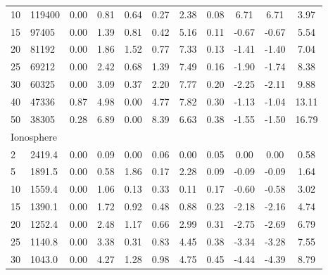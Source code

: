 {\begin{longtable}{@{}llccccccccc@{}}
10 & 119400     & 0.00         & 0.81         & 0.64        & 0.27       & 2.38        & 0.08      & 6.71      & 6.71      & 3.97  \\
15 & 97405      & 0.00         & 1.39         & 0.81        & 0.42       & 5.16        & 0.11      & -0.67     & -0.67     & 5.54  \\
20 & 81192      & 0.00         & 1.86         & 1.52        & 0.77       & 7.33        & 0.13      & -1.41     & -1.40     & 7.04  \\
25 & 69212      & 0.00         & 2.42         & 0.68        & 1.39       & 7.49        & 0.16      & -1.90     & -1.74     & 8.38  \\
30 & 60325      & 0.00         & 3.09         & 0.37        & 2.20       & 7.77        & 0.20      & -2.25     & -2.11     & 9.88  \\
40 & 47336      & 0.87         & 4.98         & 0.00        & 4.77       & 7.82        & 0.30      & -1.13     & -1.04     & 13.11 \\
50 & 38305      & 0.28         & 6.89         & 0.00        & 8.39       & 6.63        & 0.38      & -1.55     & -1.50     & 16.79 \\
\multicolumn{11}{l}{Ionosphere}                                                                                                    \\
2  & 2419.4     & 0.00         & 0.09         & 0.00        & 0.06       & 0.00        & 0.05      & 0.00      & 0.00      & 0.58  \\
5  & 1891.5     & 0.00         & 0.58         & 1.86        & 0.17       & 2.28        & 0.09      & -0.09     & -0.09     & 1.64  \\
10 & 1559.4     & 0.00         & 1.06         & 0.13        & 0.33       & 0.11        & 0.17      & -0.60     & -0.58     & 3.02  \\
15 & 1390.1     & 0.00         & 1.72         & 0.92        & 0.48       & 0.88        & 0.23      & -2.18     & -2.16     & 4.74  \\
20 & 1252.4     & 0.00         & 2.48         & 1.17        & 0.66       & 2.99        & 0.31      & -2.75     & -2.69     & 6.79  \\
25 & 1140.8     & 0.00         & 3.38         & 0.31        & 0.83       & 4.45        & 0.38      & -3.34     & -3.28     & 7.55  \\
30 & 1043.0     & 0.00         & 4.27         & 1.28        & 0.98       & 4.75        & 0.45      & -4.44     & -4.39     & 8.79  \\

\end{longtable}}
